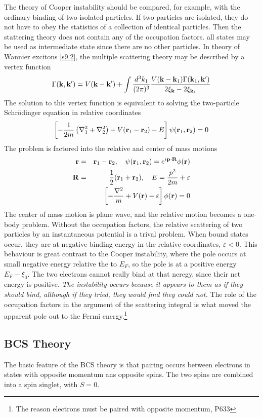 The theory of Cooper instability should be compared, for example, with the ordinary binding of two isolated particles.
If two particles are isolated, they do not have to obey the statistics of a collection of identical particles.
Then the stattering theory does not contain any of the occupation factors. all states may be used as intermediate state since there are no other particles.
In theory of Wannier excitons \ref{s9.2}, the multiple scattering theory may be described by a vertex function
\begin{equation}
    \Gamma(\mathbf{k},\mathbf{k}') = V(\mathbf{k}-\mathbf{k}') + \int \frac{d^3 k_1}{(2\pi)^3} \frac{V(\mathbf{k}-\mathbf{k}_1) \Gamma(\mathbf{k}_1,\mathbf{k}')}{2\xi_{\mathbf{k}} - 2\xi_{\mathbf{k}_1}}  \label{10.16}
\end{equation}
The solution to this vertex function is equivalent to solving the two-particle Schr{\"o}dinger equation in relative coordinates
\begin{equation}
    \left[- \frac{1}{2m} \left(\nabla_1^2 + \nabla_2^2 \right) + V(\mathbf{r}_1 -\mathbf{r}_2) -E \right] \psi(\mathbf{r}_1,\mathbf{r}_2) = 0   \label{10.17}
\end{equation}
The problem is factored into the relative and center of mass motions
\begin{eqnarray}
    \mathbf{r} &=& \mathbf{r}_1 - \mathbf{r}_2, ~ ~ ~ \psi(\mathbf{r}_1,\mathbf{r}_2) = e^{i \mathbf{p} \cdot \mathbf{R}} \phi(\mathbf{r}) \label{10.18}\\
    \mathbf{R} &=& \frac{1}{2} (\mathbf{r}_1 + \mathbf{r}_2), ~ ~ ~ E= \frac{p^2}{2m} + \varepsilon   \label{10.19} \\
    &&\left[ - \frac{\nabla^2}{m} + V(\mathbf{r}) - \varepsilon \right] \phi(\mathbf{r}) = 0 \label{10.20}
\end{eqnarray}
The center of mass motion is plane wave, and the relative motion becomes a one-body problem.
Without the occupation factors, the relative scattering of two particles by an instantaneous potential is a trival problem.
When bound states occur, they are at negative binding energy in the relative coordinates, $\varepsilon<0$.
This behaviour is great contrast to the Cooper instability, where the pole occurs at small negative energy relative the to $E_F$, so the pole is at a positive energy $E_F-\xi_0$.
The two electrons cannot really bind at that neregy, since their net energy is positive.
\textit{The instability occurs because it appears to them as if they should bind, although if they tried, they would find they could not.}
The role of the occupation factors in the argument of the scattering integral is what moved the apparent pole out to the Fermi energy.\footnote{The reason electrons must be paired with opposite momentum, P633}

\subsection{BCS Theory}
The basic feature of the BCS theory is that pairing occurs between electrons in states with opposite momentum ans opposite spins.
The two spins are combined into a spin singlet, with $S=0$.
